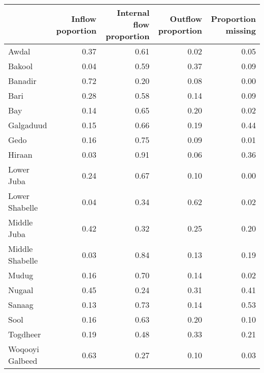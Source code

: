 \begin{tabular}{|l|rrr|r|}
\toprule
{} & Inflow poportion & Internal flow proportion & Outflow proportion & Proportion missing \\
\midrule
Awdal           &             0.37 &                     0.61 &               0.02 &               0.05 \\
Bakool          &             0.04 &                     0.59 &               0.37 &               0.09 \\
Banadir         &             0.72 &                     0.20 &               0.08 &               0.00 \\
Bari            &             0.28 &                     0.58 &               0.14 &               0.09 \\
Bay             &             0.14 &                     0.65 &               0.20 &               0.02 \\
Galgaduud       &             0.15 &                     0.66 &               0.19 &               0.44 \\
Gedo            &             0.16 &                     0.75 &               0.09 &               0.01 \\
Hiraan          &             0.03 &                     0.91 &               0.06 &               0.36 \\
Lower Juba      &             0.24 &                     0.67 &               0.10 &               0.00 \\
Lower Shabelle  &             0.04 &                     0.34 &               0.62 &               0.02 \\
Middle Juba     &             0.42 &                     0.32 &               0.25 &               0.20 \\
Middle Shabelle &             0.03 &                     0.84 &               0.13 &               0.19 \\
Mudug           &             0.16 &                     0.70 &               0.14 &               0.02 \\
Nugaal          &             0.45 &                     0.24 &               0.31 &               0.41 \\
Sanaag          &             0.13 &                     0.73 &               0.14 &               0.53 \\
Sool            &             0.16 &                     0.63 &               0.20 &               0.10 \\
Togdheer        &             0.19 &                     0.48 &               0.33 &               0.21 \\
Woqooyi Galbeed &             0.63 &                     0.27 &               0.10 &               0.03 \\
\bottomrule
\end{tabular}
